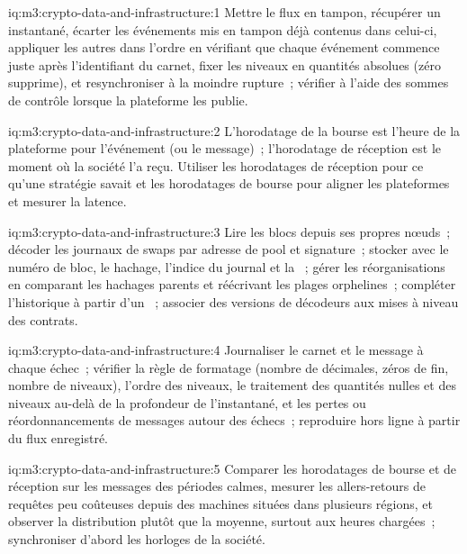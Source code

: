 \begin{solution}{iq:m3:crypto-data-and-infrastructure:1}
Mettre le flux en tampon, récupérer un instantané, écarter les événements mis en tampon déjà contenus dans celui-ci, appliquer les autres dans l'ordre en vérifiant que chaque événement commence juste après
l'identifiant du carnet, fixer les niveaux en quantités absolues (zéro supprime), et resynchroniser à la moindre rupture~; vérifier à l'aide des sommes de contrôle lorsque la plateforme les publie.
\end{solution}

\begin{solution}{iq:m3:crypto-data-and-infrastructure:2}
L'horodatage de la bourse est l'heure de la plateforme pour l'événement (ou le message)~; l'horodatage de réception est le moment où la société l'a reçu. Utiliser les horodatages de réception pour ce qu'une stratégie savait
et les horodatages de bourse pour aligner les plateformes et mesurer la latence.
\end{solution}

\begin{solution}{iq:m3:crypto-data-and-infrastructure:3}
Lire les blocs depuis ses propres nœuds~; décoder les journaux de swaps par adresse de pool et signature~; stocker avec le numéro de bloc, le hachage, l'indice du journal et la ~; gérer les réorganisations en
comparant les hachages parents et réécrivant les plages orphelines~; compléter l'historique à partir d'un ~; associer des versions de décodeurs aux mises à niveau des contrats.
\end{solution}

\begin{solution}{iq:m3:crypto-data-and-infrastructure:4}
Journaliser le carnet et le message à chaque échec~; vérifier la règle de formatage (nombre de décimales, zéros de fin, nombre de niveaux), l'ordre des niveaux, le traitement des
quantités nulles et des niveaux au-delà de la profondeur de l'instantané, et les pertes ou réordonnancements de messages autour des échecs~; reproduire hors ligne à partir du flux enregistré.
\end{solution}

\begin{solution}{iq:m3:crypto-data-and-infrastructure:5}
Comparer les horodatages de bourse et de réception sur les messages des périodes calmes, mesurer les allers-retours de requêtes peu coûteuses depuis des machines situées dans plusieurs régions, et observer la distribution plutôt
que la moyenne, surtout aux heures chargées~; synchroniser d'abord les horloges de la société.
\end{solution}


